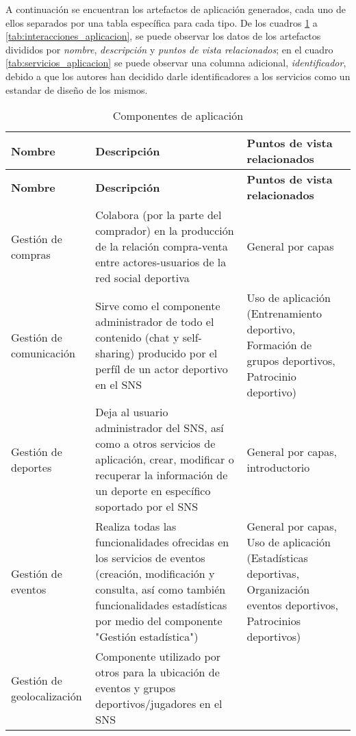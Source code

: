 A continuación se encuentran los artefactos de aplicación generados, cada uno de ellos separados por una tabla específica para cada tipo. De los cuadros \ref{tab:componentes_aplicacion} a \ref{tab:interacciones_aplicacion}, se puede observar los datos de los artefactos divididos por \textit{nombre}, \textit{descripción} y \textit{puntos de vista relacionados}; en el cuadro \ref{tab:servicios_aplicacion} se puede observar una columna adicional, \textit{identificador}, debido a que los autores han decidido darle identificadores a los servicios como un estandar de diseño de los mismos.

\begin{center}
	\begin{longtable}{|p{4cm}|p{7cm}|p{4cm}|}
		\caption{Componentes de aplicación \label{tab:componentes_aplicacion}} \\
		\hline
		\textbf{Nombre} &
		\textbf{Descripción} &
		\textbf{Puntos de vista relacionados} \\
		\hline
		\endfirsthead
		\hline
		\textbf{Nombre} &
		\textbf{Descripción} &
		\textbf{Puntos de vista relacionados} \\
		\hline
		\endhead
		\hline
		\endfoot
		\hline
		\endlastfoot
		Gestión de compras & 
			Colabora (por la parte del comprador) en la producción de la relación compra-venta entre actores-usuarios de la red social deportiva & 
			General por capas
			\\
			\hline
			Gestión de comunicación & 
			Sirve como el componente administrador de todo el contenido (chat y self-sharing) producido por el perfíl de un actor deportivo en el SNS & 
			Uso de aplicación (Entrenamiento deportivo, Formación de grupos deportivos, Patrocinio deportivo)
			\\
			\hline
			Gestión de deportes & 
			Deja al usuario administrador del SNS, así como a otros servicios de aplicación, crear, modificar o recuperar la información de un deporte en específico soportado por el SNS & 
			General por capas, introductorio
			\\
			\hline
			Gestión de eventos & 
			Realiza todas las funcionalidades ofrecidas en los servicios de eventos (creación, modificación y consulta, así como también funcionalidades estadísticas por medio del componente "Gestión estadística") & 
			General por capas, Uso de aplicación (Estadísticas deportivas, Organización eventos deportivos, Patrocinios deportivos)
			\\
			\hline
			Gestión de geolocalización & 
			Componente utilizado por otros para la ubicación de eventos y grupos deportivos/jugadores en el SNS & 

\end{longtable}
\end{center}
